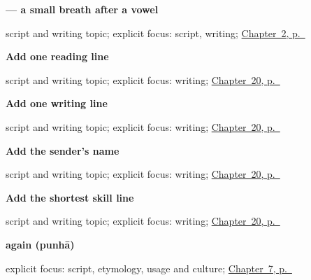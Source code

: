 \noindent\begin{minipage}[t]{\linewidth}
\raggedright
\textbf{ — a small breath after a vowel}\par
\footnotesize script and writing topic; explicit focus: script, writing; \hyperref[ch:thanks-script-a]{Chapter~2, p.~\pageref*{ch:thanks-script-a}}
\end{minipage}\par\smallskip

\noindent\begin{minipage}[t]{\linewidth}
\raggedright
\textbf{Add one reading line}\par
\footnotesize script and writing topic; explicit focus: writing; \hyperref[ch:mr-a1-named-reader-message]{Chapter~20, p.~\pageref*{ch:mr-a1-named-reader-message}}
\end{minipage}\par\smallskip

\noindent\begin{minipage}[t]{\linewidth}
\raggedright
\textbf{Add one writing line}\par
\footnotesize script and writing topic; explicit focus: writing; \hyperref[ch:mr-a1-named-reader-message]{Chapter~20, p.~\pageref*{ch:mr-a1-named-reader-message}}
\end{minipage}\par\smallskip

\noindent\begin{minipage}[t]{\linewidth}
\raggedright
\textbf{Add the sender's name}\par
\footnotesize script and writing topic; explicit focus: writing; \hyperref[ch:mr-a1-named-reader-message]{Chapter~20, p.~\pageref*{ch:mr-a1-named-reader-message}}
\end{minipage}\par\smallskip

\noindent\begin{minipage}[t]{\linewidth}
\raggedright
\textbf{Add the shortest skill line}\par
\footnotesize script and writing topic; explicit focus: writing; \hyperref[ch:mr-a1-named-reader-message]{Chapter~20, p.~\pageref*{ch:mr-a1-named-reader-message}}
\end{minipage}\par\smallskip

\noindent\begin{minipage}[t]{\linewidth}
\raggedright
\textbf{again (punhā)}\enspace\emph{}\par
\footnotesize explicit focus: script, etymology, usage and culture; \hyperref[ch:farewells]{Chapter~7, p.~\pageref*{ch:farewells}}
\end{minipage}\par\smallskip

